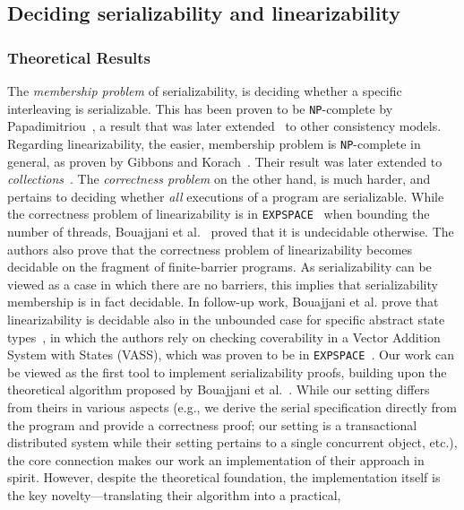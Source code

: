 \subsection{Deciding serializability and linearizability}

\subsubsection{Theoretical Results}
%
The \textit{membership problem} of serializability, is deciding whether a 
specific interleaving is serializable. This has been proven to be 
\texttt{NP}-complete 
by Papadimitriou~\cite{Pa79}, a result that was later extended~\cite{BiEn19} to 
other consistency models.
Regarding linearizability, the easier, membership problem is 
\texttt{NP}-complete in 
general, as proven by Gibbons and Korach~\cite{GiKo97}. Their result was later 
extended to \textit{collections}~\cite{EmEn18}.
%
The \textit{correctness problem} on the other hand, is much harder, and 
pertains to deciding whether \textit{all} executions of a program are 
serializable.
%
While the correctness problem of linearizability is in 
\texttt{EXPSPACE}~\cite{AlMcPe96} when bounding the number of threads, 
 Bouajjani et al.~\cite{BoEmEnHa13} proved that it is undecidable otherwise. 
 The authors also prove that the correctness problem of 
linearizability becomes decidable on the fragment of finite-barrier programs. 
As serializability can be viewed as a case in which there are no barriers, this 
implies that serializability membership is in fact decidable. 
%
In follow-up work, Bouajjani et al. prove that linearizability is decidable 
also 
in the unbounded case for specific abstract state types~\cite{BoEmEnHa18}, in 
which the authors rely on checking coverability in a Vector Addition System 
with States (VASS), which was proven to be in \texttt{EXPSPACE}~\cite{Ra78}.
%
Our work can be viewed as the first tool to implement serializability proofs, 
building upon the theoretical algorithm proposed by Bouajjani et 
al.~\cite{BoEmEnHa13}. While our setting differs from theirs in various aspects 
(e.g., we derive 
the serial specification directly from the program and provide a correctness 
proof; our setting is a transactional distributed system while their setting pertains to a single concurrent object, etc.), the core connection makes our work an implementation of their approach 
in spirit. However, despite the theoretical foundation, the implementation 
itself is the key novelty—translating their algorithm into a practical, 
